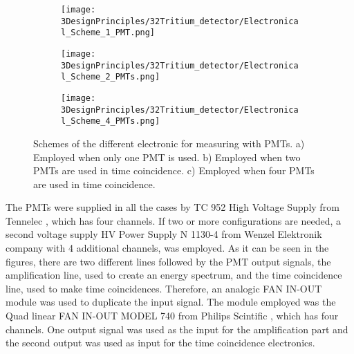 \begin{figure}
\centering
    \begin{subfigure}[b]{1.0\textwidth}
    \centering
    \texttt{[image: 3DesignPrinciples/32Tritium\_detector/Electronical\_Scheme\_1\_PMT.png]}  
    \caption{\label{subfig:ElectronicConfiguraiton1PMT}}
    \end{subfigure}
    \hfill
    \begin{subfigure}[b]{1.0\textwidth}
    \centering
    \texttt{[image: 3DesignPrinciples/32Tritium\_detector/Electronical\_Scheme\_2\_PMTs.png]}  
    \caption{\label{subfig:ElectronicConfiguraiton2PMT}}
    \end{subfigure}
    \hfill
    \begin{subfigure}[b]{1.0\textwidth}
    \centering
    \texttt{[image: 3DesignPrinciples/32Tritium\_detector/Electronical\_Scheme\_4\_PMTs.png]}  
    \caption{\label{subfig:ElectronicConfiguraiton4PMT}}
    \end{subfigure}
 \caption{Schemes of the different electronic for measuring with PMTs. a) Employed when only one PMT is used. b) Employed when two PMTs are used in time coincidence. c) Employed when four PMTs are used in time coincidence.}
 \label{fig:ElectronicConfiguraitonsPMT}
\end{figure}

The PMTs were supplied in all the cases by TC 952 High Voltage Supply from Tennelec \cite{DataSheetHVSupplyTennelec}, which has four channels. If two or more configurations are needed, a second voltage supply HV Power Supply N 1130-4 from Wenzel Elektronik company \cite{DataSheetHVSupplyWenzel} with 4 additional channels, was employed. As it can be seen in the figures, there are two different lines followed by the PMT output signals, the amplification line, used to create an energy spectrum, and the time coincidence line, used to make time coincidences. Therefore, an analogic FAN IN-OUT module was used to duplicate the input signal. The module employed was the Quad linear FAN IN-OUT MODEL 740 from Philips Scintific \cite{DataSheetFANINOUT}, which has four channels. One output signal was used as the input for the amplification part and the second output was used as input for the time coincidence electronics.


